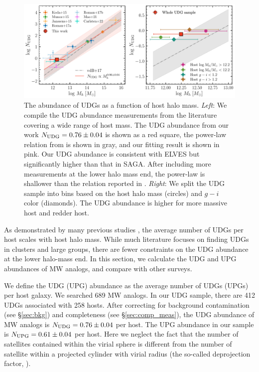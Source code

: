 \documentclass[twocolumn,astrosymb,twocolappendix]{aastex631}
\begin{document}
\begin{CJK*}{UTF8}{gbsn}
\begin{figure}
	\vbox{ 
		\centering
		\includegraphics[width=1\linewidth]{N_UDG_host_mass.pdf}
	}
    \caption{The abundance of UDGs as a function of host halo mass. \textit{Left}: We compile the UDG abundance measurements from the literature covering a wide range of host mass. The UDG abundance from our work $N_{\rm UDG} = 0.76\pm 0.04$ is shown as a red square, the power-law relation from \citet{vdBurg2017} is shown in gray, and our fitting result is shown in pink. Our UDG abundance is consistent with ELVES but significantly higher than that in SAGA. After including more measurements at the lower halo mass end, the power-law is shallower than the relation reported in \citet{vdBurg2017}. \textit{Right}: We split the UDG sample into bins based on the host halo mass (circles) and $g-i$ color (diamonds). The UDG abundance is higher for more massive host and redder host. }
    \label{fig:n_udg}
\end{figure}

As demonstrated by many previous studies \citep[e.g.,][]{vdBurg2016,vdBurg2017,Roman2017a,Karunakaran2022b}, the average number of UDGs per host scales with host halo mass. While much literature focuses on finding UDGs in clusters and large groups, there are fewer constraints on the UDG abundance at the lower halo-mass end. In this section, we calculate the UDG and UPG abundances of MW analogs, and compare with other surveys.

We define the UDG (UPG) abundance as the average number of UDGs (UPGs) per host galaxy. We searched 689 MW analogs. In our UDG sample, there are 412 UDGs associated with 258 hosts. After correcting for background contamination (see \S \ref{sec:bkg}) and completeness (see \S \ref{sec:comp_meas}), the UDG abundance of MW analogs is $N_{\rm UDG} = 0.76\pm 0.04$ per host. The UPG abundance in our sample is $N_{\rm UPG} = 0.61\pm 0.04$ per host. Here we neglect the fact that the number of satellites contained within the virial sphere is different from the number of satellite within a projected cylinder with virial radius (the so-called deprojection factor, \citealt{vdBurg2017}).



\end{CJK*}
\end{document}
